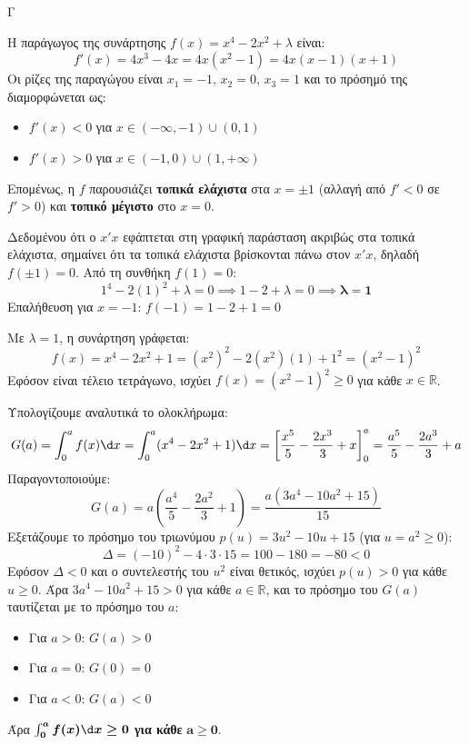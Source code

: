 \begin{thema}{Γ}
\begin{erwthma}
\item Η παράγωγος της συνάρτησης $f(x) = x^4 - 2x^2 + \lambda$ είναι:
\[ f'(x) = 4x^3 - 4x = 4x(x^2 - 1) = 4x(x-1)(x+1) \]
Οι ρίζες της παραγώγου είναι $x_1 = -1$, $x_2 = 0$, $x_3 = 1$ και το πρόσημό της διαμορφώνεται ως:
\begin{itemize}
    \item $f'(x) < 0$ για $x \in (-\infty, -1) \cup (0, 1)$
    \item $f'(x) > 0$ για $x \in (-1, 0) \cup (1, +\infty)$
\end{itemize}
Επομένως, η $f$ παρουσιάζει \textbf{τοπικά ελάχιστα} στα $x = \pm 1$ (αλλαγή από $f'<0$ σε $f'>0$) και \textbf{τοπικό μέγιστο} στο $x=0$.

Δεδομένου ότι ο $x'x$ εφάπτεται στη γραφική παράσταση ακριβώς στα τοπικά ελάχιστα, σημαίνει ότι τα τοπικά ελάχιστα βρίσκονται πάνω στον $x'x$, δηλαδή $f(\pm 1) = 0$.
Από τη συνθήκη $f(1) = 0$:
\[ 1^4 - 2(1)^2 + \lambda = 0 \implies 1 - 2 + \lambda = 0 \implies \boldsymbol{\lambda = 1} \]
Επαλήθευση για $x = -1$: $f(-1) = 1 - 2 + 1 = 0$

\item Με $\lambda = 1$, η συνάρτηση γράφεται:
\[ f(x) = x^4 - 2x^2 + 1 = (x^2)^2 - 2(x^2)(1) + 1^2 = (x^2 - 1)^2 \]
Εφόσον είναι τέλειο τετράγωνο, ισχύει $f(x) = (x^2-1)^2 \ge 0$ για κάθε $x \in \mathbb{R}$.

Υπολογίζουμε αναλυτικά το ολοκλήρωμα:
\[ G(a) = \int_0^a f(x)\d x = \int_0^a (x^4 - 2x^2 + 1)\d x = \left[ \frac{x^5}{5} - \frac{2x^3}{3} + x \right]_0^a = \frac{a^5}{5} - \frac{2a^3}{3} + a \]
Παραγοντοποιούμε:
\[ G(a) = a \left( \frac{a^4}{5} - \frac{2a^2}{3} + 1 \right) = \frac{a(3a^4 - 10a^2 + 15)}{15} \]
Εξετάζουμε το πρόσημο του τριωνύμου $p(u) = 3u^2 - 10u + 15$ (για $u = a^2 \ge 0$):
\[ \Delta = (-10)^2 - 4 \cdot 3 \cdot 15 = 100 - 180 = -80 < 0 \]
Εφόσον $\Delta < 0$ και ο συντελεστής του $u^2$ είναι θετικός, ισχύει $p(u) > 0$ για κάθε $u \ge 0$.
Άρα $3a^4 - 10a^2 + 15 > 0$ για κάθε $a \in \mathbb{R}$, και το πρόσημο του $G(a)$ ταυτίζεται με το πρόσημο του $a$:
\begin{itemize}
    \item Για $a > 0$: $G(a) > 0$
    \item Για $a = 0$: $G(0) = 0$
    \item Για $a < 0$: $G(a) < 0$
\end{itemize}
Άρα $\boldsymbol{\int_0^a f(x)\d x \ge 0}$ \textbf{για κάθε} $\boldsymbol{a \ge 0}$.


\end{erwthma}
\end{thema}
